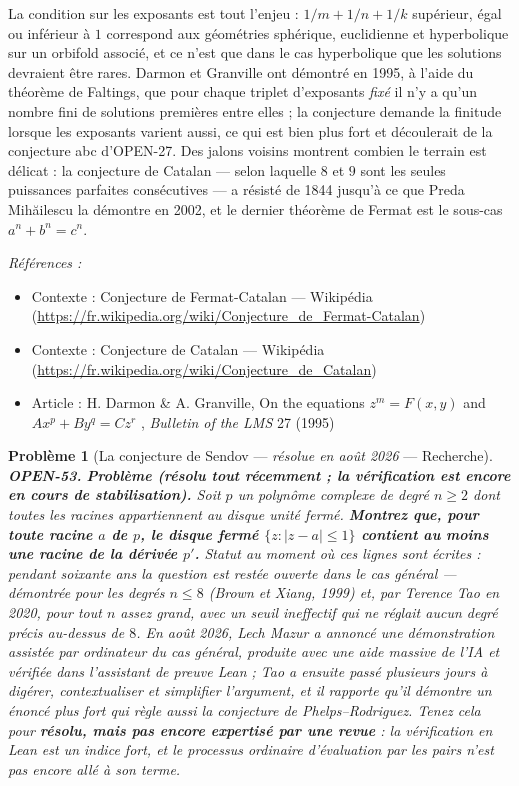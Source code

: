 \documentclass[11pt]{article}
\newtheorem{problem}{Problème}
\newenvironment{refs}{\par\small\noindent\emph{Références :}\begin{itemize}\setlength\itemsep{0pt}}{\end{itemize}\normalsize}
\begin{document}
\noindent La condition sur les exposants est tout l'enjeu :
$ 1/m + 1/n + 1/k $ supérieur, égal ou inférieur à $ 1 $ correspond aux géométries
sphérique, euclidienne et hyperbolique sur un orbifold associé, et ce n'est que dans le
cas hyperbolique que les solutions devraient être rares. Darmon et Granville ont démontré
en 1995, à l'aide du théorème de Faltings, que pour chaque triplet d'exposants \textit{fixé}
il n'y a qu'un nombre fini de solutions premières entre elles ; la conjecture demande la
finitude lorsque les exposants varient aussi, ce qui est bien plus fort et découlerait de
la conjecture abc d'OPEN-27. Des jalons voisins montrent combien le terrain est délicat :
la conjecture de Catalan --- selon laquelle $ 8 $ et $ 9 $ sont les seules puissances
parfaites consécutives --- a résisté de 1844 jusqu'à ce que Preda Mih\u{a}ilescu la démontre en
2002, et le dernier théorème de Fermat est le sous-cas $ a^{n} + b^{n} = c^{n} $.

\begin{refs}
\item Contexte : Conjecture de Fermat-Catalan --- Wikipédia (\url{https://fr.wikipedia.org/wiki/Conjecture_de_Fermat-Catalan})
\item Contexte : Conjecture de Catalan --- Wikipédia (\url{https://fr.wikipedia.org/wiki/Conjecture_de_Catalan})
\item Article : H. Darmon \& A. Granville, \og{} On the equations $ z^m = F(x,y) $ and $ Ax^p + By^q = Cz^r $ \fg{}, \textit{Bulletin of the LMS} 27 (1995)
\end{refs}

\bigskip

\begin{problem}[{La conjecture de Sendov --- \textit{résolue en août 2026} --- Recherche}]
\textbf{OPEN-53.} \textbf{Problème (résolu tout récemment ; la vérification est encore en
cours de stabilisation).} Soit $ p $ un polynôme complexe de degré $ n \geq 2 $
dont toutes les racines appartiennent au disque unité fermé. \textbf{Montrez que, pour toute
racine $ a $ de $ p $, le disque fermé $ \{ z : |z - a| \leq 1 \} $ contient au
moins une racine de la dérivée $ p' $.} Statut au moment où ces lignes sont écrites :
pendant soixante ans la question est restée ouverte dans le cas général --- démontrée pour
les degrés $ n \leq 8 $ (Brown et Xiang, 1999) et, par Terence Tao en 2020, pour tout
$ n $ assez grand, avec un seuil ineffectif qui ne réglait aucun degré précis au-dessus
de $ 8 $. En août 2026, Lech Mazur a annoncé une démonstration assistée par ordinateur
du cas général, produite avec une aide massive de l'IA et vérifiée dans l'assistant de
preuve Lean ; Tao a ensuite passé plusieurs jours à digérer, contextualiser et simplifier
l'argument, et il rapporte qu'il démontre un énoncé plus fort qui règle aussi la
conjecture de Phelps--Rodriguez. Tenez cela pour \textbf{résolu, mais pas encore expertisé par
une revue} : la vérification en Lean est un indice fort, et le processus ordinaire
d'évaluation par les pairs n'est pas encore allé à son terme.
\end{problem}
\end{document}
